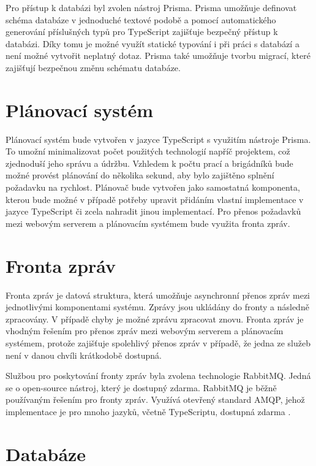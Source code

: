 Pro přístup k databázi byl zvolen nástroj Prisma. Prisma umožňuje definovat schéma databáze v jednoduché textové podobě a pomocí automatického generování
příslušných typů pro TypeScript zajišťuje bezpečný přístup k databázi. Díky tomu je možné využít statické typování i při práci s databází a není možné vytvořit
neplatný dotaz. Prisma také umožňuje tvorbu migrací, které zajišťují bezpečnou změnu schématu databáze. 

\section{Plánovací systém}

Plánovací systém bude vytvořen v jazyce TypeScript s využitím nástroje Prisma. To umožní minimalizovat počet použitých technologií napříč projektem,
což zjednoduší jeho správu a údržbu. Vzhledem k počtu prací a brigádníků bude možné provést plánování do několika sekund, aby bylo zajištěno splnění požadavku na rychlost.
Plánovač bude vytvořen jako samostatná komponenta, kterou bude možné v případě potřeby upravit přidáním vlastní implementace v jazyce TypeScript
či zcela nahradit jinou implementací. 
Pro přenos požadavků mezi webovým serverem a plánovacím systémem bude využita fronta zpráv.

\section{Fronta zpráv}

Fronta zpráv je datová struktura, která umožňuje asynchronní přenos zpráv mezi jednotlivými komponentami systému. Zprávy jsou ukládány do fronty
a následně zpracovány. V případě chyby je možné zprávu zpracovat znovu. Fronta zpráv je vhodným řešením pro přenos zpráv mezi webovým serverem a plánovacím systémem,
protože zajišťuje spolehlivý přenos zpráv v případě, že jedna ze služeb není v danou chvíli krátkodobě dostupná.

Službou pro poskytování fronty zpráv byla zvolena technologie RabbitMQ. Jedná se o open-source nástroj, který je dostupný zdarma. RabbitMQ je běžně používaným řešením
pro fronty zpráv. Využívá otevřený standard AMQP, jehož implementace je pro mnoho jazyků, včetně TypeScriptu, dostupná zdarma \cite{rabbitmq}.


\section{Databáze}

